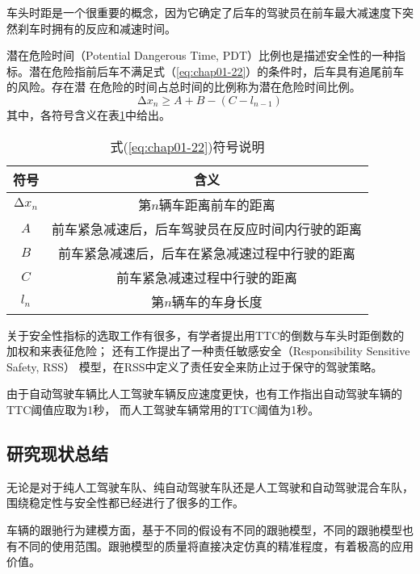 车头时距是一个很重要的概念，因为它确定了后车的驾驶员在前车最大减速度下突然刹车时拥有的反应和减速时间。

潜在危险时间（Potential Dangerous Time, PDT）比例也是描述安全性的一种指标。潜在危险指前后车不满足式（\ref{eq:chap01-22}）的条件时，后车具有追尾前车的风险。存在潜
在危险的时间占总时间的比例称为潜在危险时间比例。
\begin{equation}
  \increment{x}_n \geqslant A + B - (C - l_{n-1})
  \label{eq:chap01-22}
\end{equation}
其中，各符号含义在表\ref{tab:chap01-9}中给出。
\begin{table}
  \centering
  \caption{式(\ref{eq:chap01-22})符号说明}
  \begin{tabular}{cc}
    \toprule
    符号          &  含义                         \\
    \midrule
    $\increment{x}_n$          &    第$n$辆车距离前车的距离         \\
    $A$                        &    前车紧急减速后，后车驾驶员在反应时间内行驶的距离      \\
    $B$                        &    前车紧急减速后，后车在紧急减速过程中行驶的距离      \\
    $C$                        &    前车紧急减速过程中行驶的距离      \\
    $l_n$                      &    第$n$辆车的车身长度     \\
    \bottomrule
  \end{tabular}
  \label{tab:chap01-9}
\end{table}

关于安全性指标的选取工作有很多，有学者提出用TTC的倒数与车头时距倒数的加权和来表征危险\cite{Kondoh2008iden}；
还有工作\cite{DBLP:journals/corr/abs-1708-06374}提出了一种责任敏感安全（Responsibility Sensitive Safety, RSS）
模型，在RSS中定义了责任安全来防止过于保守的驾驶策略。

由于自动驾驶车辆比人工驾驶车辆反应速度更快，也有工作\cite{Morando2018Studying}指出自动驾驶车辆的TTC阈值应取为1秒，
而人工驾驶车辆常用的TTC阈值为1秒。

\subsection{研究现状总结}

无论是对于纯人工驾驶车队、纯自动驾驶车队还是人工驾驶和自动驾驶混合车队，围绕稳定性与安全性都已经进行了很多的工作。

车辆的跟驰行为建模方面，基于不同的假设有不同的跟驰模型，不同的跟驰模型也有不同的使用范围。跟驰模型的质量将直接决定仿真的精准程度，有着极高的应用价值。

